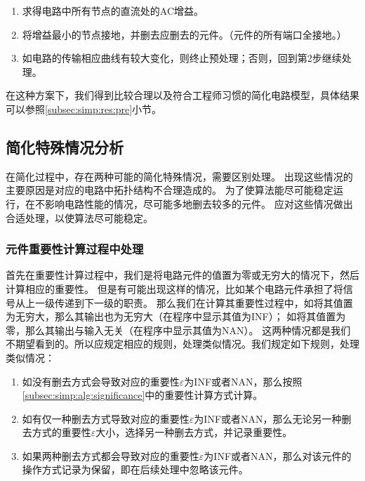 \begin{enumerate}
	\item 求得电路中所有节点的直流处的AC增益。
	\item 将增益最小的节点接地，并删去应删去的元件。（元件的所有端口全接地。）
	\item 如电路的传输相应曲线有较大变化，则终止预处理；否则，回到第2步继续处理。
\end{enumerate}

在这种方案下，我们得到比较合理以及符合工程师习惯的简化电路模型，具体结果可以参照\ref{subsec:simp:res:pre}小节。

\subsection{简化特殊情况分析}
\label{subsec:simp:alg:special}

在简化过程中，存在两种可能的简化特殊情况，需要区别处理。
出现这些情况的主要原因是对应的电路中拓扑结构不合理造成的。
为了使算法能尽可能稳定运行，在不影响电路性能的情况，尽可能多地删去较多的元件。
应对这些情况做出合适处理，以使算法尽可能稳定。

\subsubsection{元件重要性计算过程中处理}
\label{subsubsec:simp:alg:special:sign}

首先在重要性计算过程中，我们是将电路元件的值置为零或无穷大的情况下，然后计算相应的重要性。
但是有可能出现这样的情况，比如某个电路元件承担了将信号从上一级传递到下一级的职责。
那么我们在计算其重要性过程中，如将其值置为无穷大，那么其输出也为无穷大（在程序中显示其值为INF）；
如将其值置为零，那么其输出与输入无关（在程序中显示其值为NAN）。
这两种情况都是我们不期望看到的。所以应规定相应的规则，处理类似情况。我们规定如下规则，处理类似情况：

\begin{enumerate}[label=\emph{\alph*})]
	\item 如没有删去方式会导致对应的重要性$\varepsilon$为INF或者NAN，那么按照\ref{subsec:simp:alg:significance}中的重要性计算方式计算。
	\item 如有仅一种删去方式导致对应的重要性$\varepsilon$为INF或者NAN，那么无论另一种删去方式的重要性$\varepsilon$大小，选择另一种删去方式，并记录重要性。
	\item 如果两种删去方式都会导致对应的重要性$\varepsilon$为INF或者NAN，那么对该元件的操作方式记录为保留，即在后续处理中忽略该元件。
\end{enumerate}

